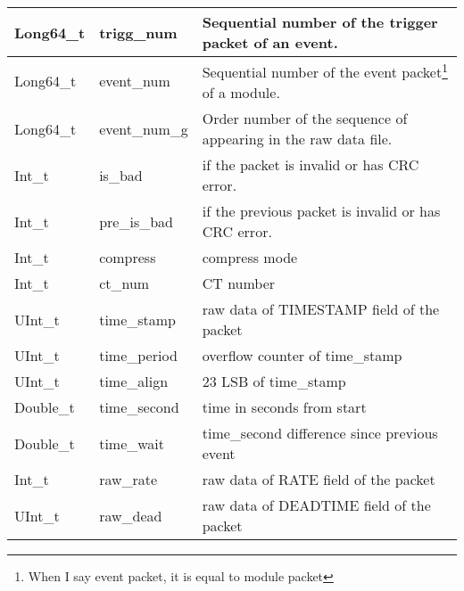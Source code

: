 \documentclass[a4paper, 12pt, onecolumn]{article}
\begin{document}
\begin{center}
  \label{tab:t-modules}    
  \tablelasttail{\hline}
  \begin{mpsupertabular}{| p{28mm} | p{25mm} | p{70mm} |}
    Long64\_t          & trigg\_num          & Sequential number of the trigger packet of an event. \\\hline
    Long64\_t          & event\_num          & Sequential number of the event packet\footnote{When I say event packet, it is equal to module packet} of a module. \\\hline
    Long64\_t          & event\_num\_g       & Order number of the sequence of appearing in the raw data file. \\\hline
    Int\_t             & is\_bad             & if the packet is invalid or has CRC error. \\\hline
    Int\_t             & pre\_is\_bad        & if the previous packet is invalid or has CRC error. \\\hline
    Int\_t             & compress            & compress mode \\\hline
    Int\_t             & ct\_num             & CT number \\\hline
    UInt\_t            & time\_stamp         & raw data of TIMESTAMP field of the packet \\\hline
    UInt\_t            & time\_period        & overflow counter of time\_stamp \\\hline
    UInt\_t            & time\_align         & 23 LSB of time\_stamp  \\\hline
    Double\_t          & time\_second        & time in seconds from start  \\\hline
    Double\_t          & time\_wait          & time\_second difference since previous event \\\hline
    Int\_t             & raw\_rate           & raw data of RATE field of the packet \\\hline
    UInt\_t            & raw\_dead           & raw data of DEADTIME field of the packet \\\hline

\end{mpsupertabular}
\end{center}
\end{document}
